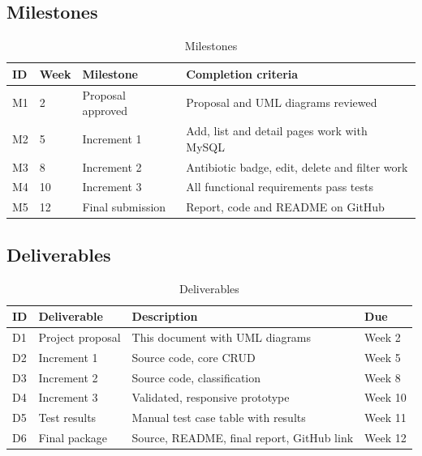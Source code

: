 \documentclass[11pt,a4paper]{article}
\begin{document}
\subsection{Milestones}
\begin{table}[H]
\centering
\caption{Milestones}
\begin{tabularx}{\textwidth}{llYY}
\toprule
\textbf{ID} & \textbf{Week} & \textbf{Milestone} & \textbf{Completion criteria}\\
\midrule
M1 & 2 & Proposal approved & Proposal and UML diagrams reviewed\\
M2 & 5 & Increment 1 & Add, list and detail pages work with MySQL\\
M3 & 8 & Increment 2 & Antibiotic badge, edit, delete and filter work\\
M4 & 10 & Increment 3 & All functional requirements pass tests\\
M5 & 12 & Final submission & Report, code and README on GitHub\\
\bottomrule
\end{tabularx}
\end{table}

\subsection{Deliverables}
\begin{table}[H]
\centering
\caption{Deliverables}
\begin{tabularx}{\textwidth}{llYl}
\toprule
\textbf{ID} & \textbf{Deliverable} & \textbf{Description} & \textbf{Due}\\
\midrule
D1 & Project proposal & This document with UML diagrams & Week 2\\
D2 & Increment 1 & Source code, core CRUD & Week 5\\
D3 & Increment 2 & Source code, classification & Week 8\\
D4 & Increment 3 & Validated, responsive prototype & Week 10\\
D5 & Test results & Manual test case table with results & Week 11\\
D6 & Final package & Source, README, final report, GitHub link & Week 12\\
\bottomrule
\end{tabularx}
\end{table}
\end{document}

